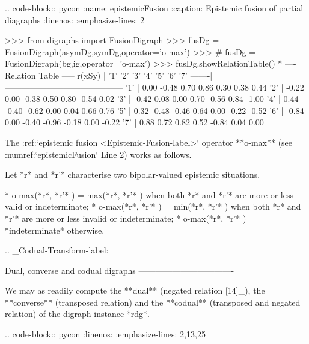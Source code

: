 {.. code-block:: pycon
   :name: epistemicFusion
   :caption: Epistemic fusion of partial diagraphs
   :linenos:
   :emphasize-lines: 2

   >>> from digraphs import FusionDigraph
   >>> fusDg = FusionDigraph(asymDg,symDg,operator='o-max')
   >>> # fusDg = FusionDigraph(bg,ig,operator='o-max')
   >>> fusDg.showRelationTable()
    * ---- Relation Table -----
    r(xSy) |  '1'    '2'   '3'  '4'   '5'    '6'  '7'	  
    -------|------------------------------------------
    '1'    |  0.00 -0.48  0.70  0.86  0.30  0.38  0.44	 
    '2'    | -0.22  0.00 -0.38  0.50  0.80 -0.54  0.02	 
    '3'    | -0.42  0.08  0.00  0.70 -0.56  0.84 -1.00	 
    '4'    |  0.44 -0.40 -0.62  0.00  0.04  0.66  0.76	 
    '5'    |  0.32 -0.48 -0.46  0.64  0.00 -0.22 -0.52	 
    '6'    | -0.84  0.00 -0.40 -0.96 -0.18  0.00 -0.22	 
    '7'    |  0.88  0.72  0.82  0.52 -0.84  0.04  0.00

The :ref:`epistemic fusion <Epistemic-Fusion-label>` operator **o-max** (see :numref:`epistemicFusion` Line 2) works as follows.

Let *r* and *r'* characterise two bipolar-valued epistemic situations.

   * o-max(*r*, *r'* ) = max(*r*, *r'* ) when both *r* and *r'* are more or less valid or indeterminate;
   * o-max(*r*, *r'* ) = min(*r*, *r'* ) when both *r* and *r'* are more or less invalid or indeterminate;
   * o-max(*r*, *r'* ) = *indeterminate* otherwise.

.. _Codual-Transform-label:    

Dual, converse and codual digraphs
----------------------------------

We may as readily compute the **dual** (negated relation [14]_), the **converse** (transposed relation) and the **codual** (transposed and negated relation) of the digraph instance *rdg*. 

.. code-block:: pycon
   :linenos:
   :emphasize-lines: 2,13,25

}
